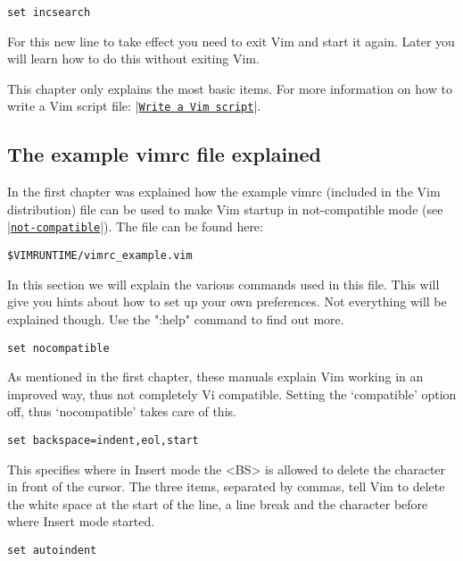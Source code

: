  \begin{Verbatim}[samepage=true]
 set incsearch
 \end{Verbatim}

For this new line to take effect you need to exit Vim and start it again.
Later you will learn how to do this without exiting Vim.

This chapter only explains the most basic items.
For more information on how to write a Vim script file: |\hyperref[Write a Vim script]{\texttt{Write a Vim script}}|.

\subsection{The example vimrc file explained}
\label{vimrc_example.vim}

In the first chapter was explained how the example vimrc (included in the Vim distribution) file can be used to make Vim startup in not-compatible mode (see \hyperref[not-compatible]{|\texttt{not-compatible}|}).
The file can be found here:

\begin{Verbatim}[samepage=true]
    $VIMRUNTIME/vimrc_example.vim
\end{Verbatim}

In this section we will explain the various commands used in this file.
This will give you hints about how to set up your own preferences.
Not everything will be explained though.
Use the ":help" command to find out more.

 \begin{Verbatim}[samepage=true]
 set nocompatible
 \end{Verbatim}

As mentioned in the first chapter, these manuals explain Vim working in an improved way, thus not completely Vi compatible.
Setting the `compatible' option off, thus `nocompatible' takes care of this.

 \begin{Verbatim}[samepage=true]
 set backspace=indent,eol,start
 \end{Verbatim}

This specifies where in Insert mode the <BS> is allowed to delete the character in front of the cursor.
The three items, separated by commas, tell Vim to delete the white space at the start of the line, a line break and the character before where Insert mode started.

 \begin{Verbatim}[samepage=true]
 set autoindent
 \end{Verbatim}

